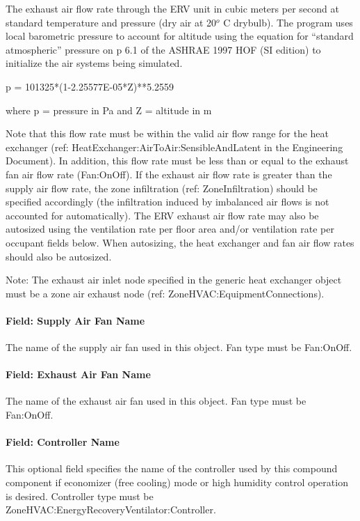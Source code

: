 The exhaust air flow rate through the ERV unit in cubic meters per second at standard temperature and pressure (dry air at 20\(^{o}\) C drybulb). The program uses local barometric pressure to account for altitude using the equation for ``standard atmospheric'' pressure on p 6.1 of the ASHRAE 1997 HOF (SI edition) to initialize the air systems being simulated.

p = 101325*(1-2.25577E-05*Z)**5.2559

where p = pressure in Pa and Z = altitude in m

Note that this flow rate must be within the valid air flow range for the heat exchanger (ref: HeatExchanger:AirToAir:SensibleAndLatent in the Engineering Document). In addition, this flow rate must be less than or equal to the exhaust fan air flow rate (Fan:OnOff). If the exhaust air flow rate is greater than the supply air flow rate, the zone infiltration (ref: ZoneInfiltration) should be specified accordingly (the infiltration induced by imbalanced air flows is not accounted for automatically). The ERV exhaust air flow rate may also be autosized using the ventilation rate per floor area and/or ventilation rate per occupant fields below. When autosizing, the heat exchanger and fan air flow rates should also be autosized.

Note: The exhaust air inlet node specified in the generic heat exchanger object must be a zone air exhaust node (ref: ZoneHVAC:EquipmentConnections).

\paragraph{Field: Supply Air Fan Name}\label{field-supply-air-fan-name-7}

The name of the supply air fan used in this object. Fan type must be Fan:OnOff.

\paragraph{Field: Exhaust Air Fan Name}\label{field-exhaust-air-fan-name}

The name of the exhaust air fan used in this object. Fan type must be Fan:OnOff.

\paragraph{Field: Controller Name}\label{field-controller-name}

This optional field specifies the name of the controller used by this compound component if economizer (free cooling) mode or high humidity control operation is desired. Controller type must be ZoneHVAC:EnergyRecoveryVentilator:Controller.

